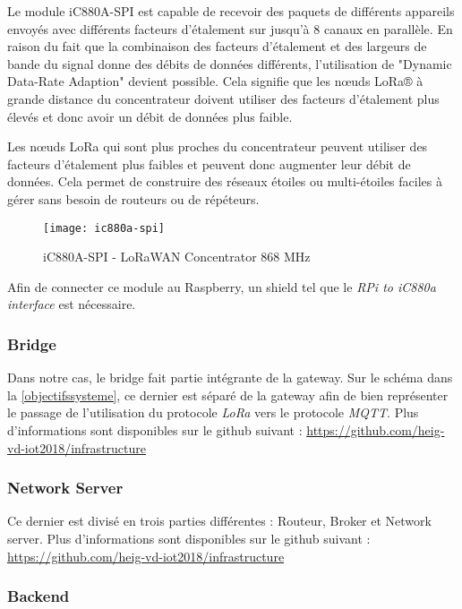 \newpage
Le module iC880A-SPI est capable de recevoir des paquets de différents appareils envoyés avec différents facteurs d'étalement sur jusqu'à 8 canaux en parallèle. En raison du fait que la combinaison des facteurs d'étalement et des largeurs de bande du signal donne des débits de données différents, l'utilisation de "Dynamic Data-Rate Adaption" devient possible. Cela signifie que les nœuds LoRa® à grande distance du concentrateur doivent utiliser des facteurs d'étalement plus élevés et donc avoir un débit de données plus faible.

Les nœuds LoRa qui sont plus proches du concentrateur peuvent utiliser des facteurs d'étalement plus faibles et peuvent donc augmenter leur débit de données. Cela permet de construire des réseaux étoiles ou multi-étoiles faciles à gérer sans besoin de routeurs ou de répéteurs.

\begin{figure}[!h]
	\centering
	\texttt{[image: ic880a-spi]}
	\caption{iC880A-SPI - LoRaWAN Concentrator 868 MHz}
	\label{}
\end{figure}

Afin de connecter ce module au Raspberry, un shield tel que le \textit{RPi to iC880a interface} est nécessaire.

\newpage

\subsubsection{Bridge}

Dans notre cas, le bridge fait partie intégrante de la gateway. Sur le schéma dans la \autoref{objectifssysteme}, ce dernier est séparé de la gateway afin de bien représenter le passage de l'utilisation du protocole \textit{LoRa} vers le protocole \textit{MQTT}.
Plus d'informations sont disponibles sur le github suivant : \url{https://github.com/heig-vd-iot2018/infrastructure}

\subsubsection{Network Server}

Ce dernier est divisé en trois parties différentes : Routeur, Broker et Network server.
Plus d'informations sont disponibles sur le github suivant : \url{https://github.com/heig-vd-iot2018/infrastructure}
\subsubsection{Backend}

